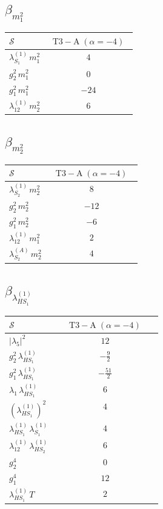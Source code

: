 \documentclass[9pt]{article}
\begin{document}
\subsection*{$ \beta_{m_1^{2}} $}
\begin{longtable}{@{}p{0.31\linewidth}c@{}}
\toprule
$\mathcal{S}$ & $ \mathrm{T3-A}\;(\alpha=-4) $ \\
\midrule
$ \lambda_{S_1}^{(1)}\,m_1^{2} $ & $ 4 $ \\
$ g_2^2\,m_1^{2} $ & $ 0 $ \\
$ g_1^2\,m_1^{2} $ & $ -24 $ \\
$ \lambda_{12}^{(1)}\,m_2^{2} $ & $ 6 $ \\
\bottomrule
\end{longtable}
\subsection*{$ \beta_{m_2^{2}} $}
\begin{longtable}{@{}p{0.31\linewidth}c@{}}
\toprule
$\mathcal{S}$ & $ \mathrm{T3-A}\;(\alpha=-4) $ \\
\midrule
$ \lambda_{S_2}^{(1)}\,m_2^{2} $ & $ 8 $ \\
$ g_2^2\,m_2^{2} $ & $ -12 $ \\
$ g_1^2\,m_2^{2} $ & $ -6 $ \\
$ \lambda_{12}^{(1)}\,m_1^{2} $ & $ 2 $ \\
$ \lambda_{S_2}^{(A)}\,m_2^{2} $ & $ 4 $ \\
\bottomrule
\end{longtable}
\subsection*{$ \beta_{\lambda_{HS_1}^{(1)}} $}
\begin{longtable}{@{}p{0.31\linewidth}c@{}}
\toprule
$\mathcal{S}$ & $ \mathrm{T3-A}\;(\alpha=-4) $ \\
\midrule
$ |\lambda_5|^2 $ & $ 12 $ \\
$ g_2^2\,\lambda_{HS_1}^{(1)} $ & $ - \frac{9}{2} $ \\
$ g_1^2\,\lambda_{HS_1}^{(1)} $ & $ - \frac{51}{2} $ \\
$ \lambda_1\,\lambda_{HS_1}^{(1)} $ & $ 6 $ \\
$ \left(\lambda_{HS_1}^{(1)}\right)^2 $ & $ 4 $ \\
$ \lambda_{HS_1}^{(1)}\,\lambda_{S_1}^{(1)} $ & $ 4 $ \\
$ \lambda_{12}^{(1)}\,\lambda_{HS_2}^{(1)} $ & $ 6 $ \\
$ g_2^4 $ & $ 0 $ \\
$ g_1^4 $ & $ 12 $ \\
$ \lambda_{HS_1}^{(1)}\,T $ & $ 2 $ \\
\bottomrule
\end{longtable}
\end{document}
